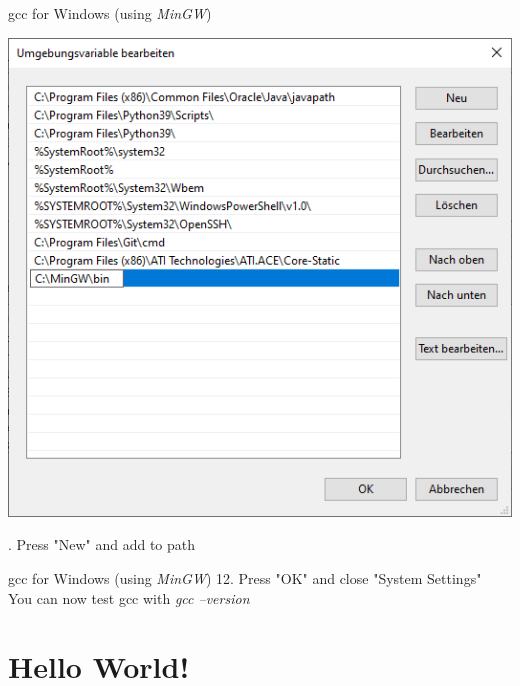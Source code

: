 \begin{frame}{gcc for Windows (using \textit{MinGW})}
	\centerline{\includegraphics[scale=.4]{../img/install/path/path.png}}
	. Press "New" and add  to path
\end{frame}

\begin{frame}{gcc for Windows (using \textit{MinGW})}
	12. Press "OK" and close "System Settings" \\
	\bigskip
	You can now test gcc with \textit{gcc --version}
\end{frame}

\section{Hello World!}
